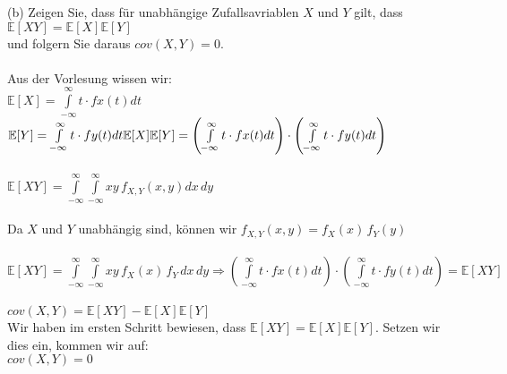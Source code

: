 \documentclass[a4paper]{article}
\begin{document}
(b) Zeigen Sie, dass für unabhängige Zufallsavriablen $X$ und $Y$ gilt, dass $\mathbb{E}[XY ] = \mathbb{E}[X]\mathbb{E}[Y ]$\\
und folgern Sie daraus $cov(X, Y ) = 0$.\\\\
Aus der Vorlesung wissen wir:\\
$\mathbb{E}[X] = \int\limits_{-\infty}^\infty t \cdot fx(t)dt$\\
\(\mathbb{E}[Y] = \int\limits_{-\infty}^\infty t \cdot fy(t)dt\\
\mathbb{E}[X]\mathbb{E}[Y] = \left(\int\limits_{-\infty}^\infty t \cdot fx(t)dt\right) \cdot \left(\int\limits_{-\infty}^\infty t \cdot fy(t)dt\right)\)\\\\
\(\mathbb{E}[XY] = \int\limits^\infty_{-\infty}\int\limits^\infty_{-\infty}xy\, f_{X,Y}(x,y)dx\, dy\)\\\\
Da $X$ und $Y$ unabhängig sind, können wir $f_{X,Y}(x,y)=f_X(x)\, f_Y(y)$\\\\
\(\mathbb{E}[XY] = \int\limits^\infty_{-\infty}\int\limits^\infty_{-\infty} xy \, f_X (x)\, f_Y\, dx\, dy \Rightarrow \left(\int\limits_{-\infty}^\infty t \cdot fx(t)dt\right) \cdot \left(\int\limits_{-\infty}^\infty t \cdot fy(t)dt\right) = \mathbb{E}[XY]\)\\\\
\(cov(X,Y)= \mathbb{E}[XY]-\mathbb{E}[X]\mathbb{E}[Y]\)\\
Wir haben im ersten Schritt bewiesen, dass \(\mathbb{E}[XY]=\mathbb{E}[X]\mathbb{E}[Y]\). Setzen wir dies ein, kommen wir auf:\\
\(cov(X,Y)=0\)
\clearpage
\end{document}
